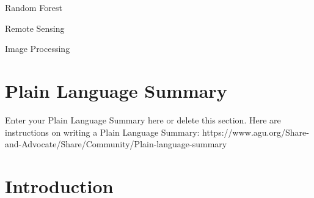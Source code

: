 \documentclass[draft]{agujournal2019}
\begin{document}
\begin{keypoints}
\item Random Forest
\item Remote Sensing
\item Image Processing
\end{keypoints}

%
%

%
%


\begin{abstract}
[ enter your Abstract here ]
\end{abstract}

\section*{Plain Language Summary}
Enter your Plain Language Summary here or delete this section.
Here are instructions on writing a Plain Language Summary: 
https://www.agu.org/Share-and-Advocate/Share/Community/Plain-language-summary


%
%

 \section{Introduction}
%

\end{document}
